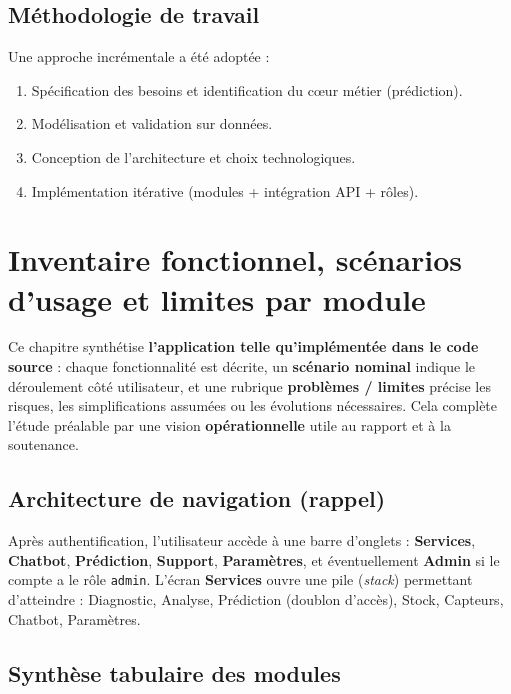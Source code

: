 \documentclass[12pt,a4paper,twoside,openright]{report}
\begin{document}
\section{Méthodologie de travail}

Une approche incrémentale a été adoptée :
\begin{enumerate}
  \item Spécification des besoins et identification du cœur métier (prédiction).
  \item Modélisation et validation sur données.
  \item Conception de l'architecture et choix technologiques.
  \item Implémentation itérative (modules + intégration API + rôles).
\end{enumerate}

\cleardoublepage

\chapter{Inventaire fonctionnel, scénarios d'usage et limites par module}
\label{chap:inventaire}

Ce chapitre synthétise \textbf{l'application telle qu'implémentée dans le code source} : chaque fonctionnalité est décrite, un \textbf{scénario nominal} indique le déroulement côté utilisateur, et une rubrique \textbf{problèmes / limites} précise les risques, les simplifications assumées ou les évolutions nécessaires. Cela complète l'étude préalable par une vision \textbf{opérationnelle} utile au rapport et à la soutenance.

\section{Architecture de navigation (rappel)}

Après authentification, l'utilisateur accède à une barre d'onglets : \textbf{Services}, \textbf{Chatbot}, \textbf{Prédiction}, \textbf{Support}, \textbf{Paramètres}, et éventuellement \textbf{Admin} si le compte a le rôle \texttt{admin}. L'écran \textbf{Services} ouvre une pile (\textit{stack}) permettant d'atteindre : Diagnostic, Analyse, Prédiction (doublon d'accès), Stock, Capteurs, Chatbot, Paramètres.

\section{Synthèse tabulaire des modules}
\end{document}
